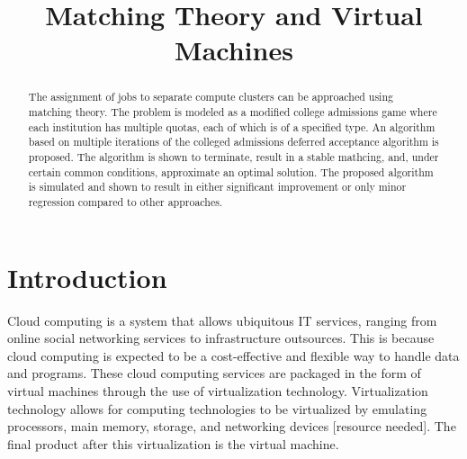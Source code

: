 \documentclass[conference]{IEEEtran}
\begin{document}
%
\title{Matching Theory and Virtual Machines}


\author{
\and
{}
}


\maketitle


\begin{abstract}
The assignment of jobs to separate compute clusters 
can be approached using matching theory. 
The problem is modeled as a modified college admissions
game where each institution has multiple quotas,
each of which is of a specified type.
An algorithm based on multiple iterations of the 
colleged admissions deferred acceptance algorithm is 
proposed.
The algorithm is shown to terminate, result in 
a stable mathcing, and, under certain common conditions,
approximate an optimal solution.
The proposed algorithm is simulated 
and shown to result in either significant improvement 
or only minor regression compared to other approaches.
\end{abstract}


\section{Introduction}
Cloud computing is a system that allows ubiquitous IT services,
ranging from online social networking services to infrastructure
outsources.  This is because cloud computing is expected to
be a cost-effective and flexible way to handle data and programs.
These cloud computing services are packaged in the form of
virtual machines through the use of virtualization technology.
Virtualization technology allows for computing technologies
to be virtualized by emulating processors, main memory, storage,
and networking devices [resource needed].  The final product after this virtualization
is the virtual machine.
\end{document}
